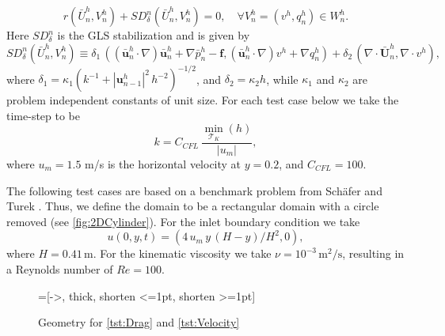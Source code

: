 \begin{equation}
  r(\bar{U}^h_n, V^h_n) + SD_{\delta}^n(\bar{U}^h_n, V^h_n) = 0, \quad \forall
    V^h_n = (v^h, q^h_n) \in W^h_n.
  \label{eqn:G2}
\end{equation}
Here $SD_{\delta}^n$ is the GLS stabilization and is given by
\begin{equation}
    SD_{\delta}^n(\bar{U}^h_n, V^h_n) \equiv
        \delta_1\,(\left(\bar{\mathbf{u}}^h_n \cdot \nabla \right)
            \bar{\mathbf{u}}^h_n + \nabla \bar{p}^h_n - \mathbf{f},
        \left(\bar{\mathbf{u}}^h_n \cdot \nabla \right) v^h + \nabla q^h_n)
            + \delta_2\,(\nabla \cdot \bar{\mathbf{U}}^h_n, \nabla \cdot v^h),
  \label{eqn:NSEStabilization}
\end{equation}
where $\delta_1 = \kappa_1 (k^{-1} + |\mathbf{u}^h_{n-1}|^2\, h^{-2})^{-1/2}$,
and $\delta_2 = \kappa_2 h$, while $\kappa_1$ and $\kappa_2$ are problem
independent constants of unit size. For each test case below we take the
time-step to be
\begin{equation*}
    k = C_{CFL}\, \frac{\min_{\mathcal{T}_K}(h)}{|u_m|},
\end{equation*}
where $u_m = 1.5$ m/s is the horizontal velocity at $y = 0.2$, and
$C_{CFL}=100$.

The following test cases are based on a benchmark problem from Sch\"afer and
Turek \cite[Test case 2D-2]{Schaefer1996}. Thus, we define the domain to be a
rectangular domain with a circle removed (see \autoref{fig:2DCylinder}). For the
inlet boundary condition we take
\begin{equation}
    u(0, y, t) = (4\, u_m\,y\, (H - y)/H^2, 0),
    \label{eqn:2DInlet}
\end{equation}
where $H = 0.41\, \text{m}$. For the kinematic
viscosity we take $\nu = 10^{-3}\, \text{m}^2\text{/s}$, resulting in a
Reynolds number of $Re=100$.

\begin{figure}[h]
    \centering
    =[->, thick, shorten <=1pt, shorten >=1pt]
    \caption{Geometry for \autoref{tst:Drag} and \autoref{tst:Velocity}}
    \label{fig:2DCylinder}
\end{figure}


